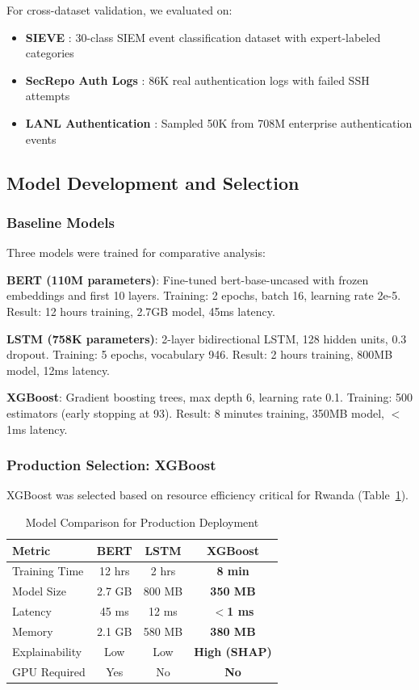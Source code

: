 \documentclass[11pt,conference]{IEEEtran}
\begin{document}
For cross-dataset validation, we evaluated on:
\begin{itemize}
    \item \textbf{SIEVE} \cite{sieve_dataset}: 30-class SIEM event classification dataset with expert-labeled categories
    \item \textbf{SecRepo Auth Logs} \cite{secrepo}: 86K real authentication logs with failed SSH attempts
    \item \textbf{LANL Authentication} \cite{lanl_auth}: Sampled 50K from 708M enterprise authentication events
\end{itemize}

\subsection{Model Development and Selection}

\subsubsection{Baseline Models}

Three models were trained for comparative analysis:

\textbf{BERT (110M parameters)}: Fine-tuned bert-base-uncased with frozen embeddings and first 10 layers. Training: 2 epochs, batch 16, learning rate 2e-5. Result: 12 hours training, 2.7GB model, 45ms latency.

\textbf{LSTM (758K parameters)}: 2-layer bidirectional LSTM, 128 hidden units, 0.3 dropout. Training: 5 epochs, vocabulary 946. Result: 2 hours training, 800MB model, 12ms latency.

\textbf{XGBoost}: Gradient boosting trees, max depth 6, learning rate 0.1. Training: 500 estimators (early stopping at 93). Result: 8 minutes training, 350MB model, $<$1ms latency.

\subsubsection{Production Selection: XGBoost}

XGBoost was selected based on resource efficiency critical for Rwanda (Table~\ref{tab:model_comparison}).

\begin{table}[!t]
\centering
\caption{Model Comparison for Production Deployment}
\label{tab:model_comparison}
\begin{tabular}{@{}lccc@{}}
\toprule
\textbf{Metric} & \textbf{BERT} & \textbf{LSTM} & \textbf{XGBoost} \\
\midrule
Training Time & 12 hrs & 2 hrs & \textbf{8 min} \\
Model Size & 2.7 GB & 800 MB & \textbf{350 MB} \\
Latency & 45 ms & 12 ms & \textbf{$<$1 ms} \\
Memory & 2.1 GB & 580 MB & \textbf{380 MB} \\
Explainability & Low & Low & \textbf{High (SHAP)} \\
GPU Required & Yes & No & \textbf{No} \\
\bottomrule
\end{tabular}
\end{table}
\end{document}
